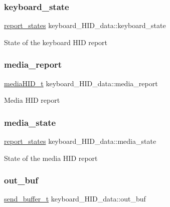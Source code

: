 \subsubsection{\texorpdfstring{keyboard\+\_\+state}{keyboard\_state}}
{\footnotesize\ttfamily \hyperlink{states_8h_a97ae098857b45ee4ac9f7ae3a41a7aff}{report\+\_\+states} keyboard\+\_\+\+H\+I\+D\+\_\+data\+::keyboard\+\_\+state}

State of the keyboard H\+ID report \mbox{\label{structkeyboard__HID__data_aeaf1a6f8022be4e979a747412abc5d20}} 
\subsubsection{\texorpdfstring{media\+\_\+report}{media\_report}}
{\footnotesize\ttfamily \hyperlink{keyboard_8h_a863aa6aa64424c7553e59386523412fe}{media\+H\+I\+D\+\_\+t} keyboard\+\_\+\+H\+I\+D\+\_\+data\+::media\+\_\+report}

Media H\+ID report \mbox{\label{structkeyboard__HID__data_a93abdb2e65e86baa42983d4e25dfcfe3}} 
\subsubsection{\texorpdfstring{media\+\_\+state}{media\_state}}
{\footnotesize\ttfamily \hyperlink{states_8h_a97ae098857b45ee4ac9f7ae3a41a7aff}{report\+\_\+states} keyboard\+\_\+\+H\+I\+D\+\_\+data\+::media\+\_\+state}

State of the media H\+ID report \mbox{\label{structkeyboard__HID__data_a06a382dbb1ae17ec5fbb37d159ba2d53}} 
\subsubsection{\texorpdfstring{out\+\_\+buf}{out\_buf}}
{\footnotesize\ttfamily \hyperlink{keyboard_8h_ac075e64fc5b9925d7511d8afb5bdb2d2}{send\+\_\+buffer\+\_\+t} keyboard\+\_\+\+H\+I\+D\+\_\+data\+::out\+\_\+buf}

